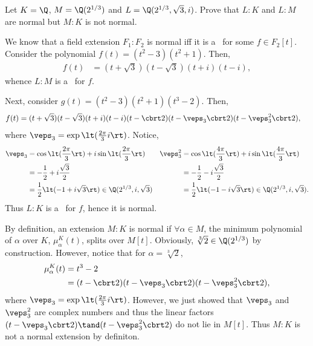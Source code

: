 \documentclass{article}
\begin{document}
\setcounter{section}{7} %
\begin{exercise}
Let \( K = \Q \), \( M = \Q(2^{1/3}) \) and \( L = \Q(2^{1/3}, \sqrt 3, i) \).
Prove that \( L:K \) and \( L:M \) are normal but \( M:K \) is not normal.
\end{exercise}
\begin{solution}
We know that a field extension \( F_1:F_2 \) is normal iff it is a \sfe~for some \( f\in F_2[t] \).
Consider the polynomial \( f(t) = (t^2-3)(t^2+1) \).
Then, \begin{align*}
  f(t) &= (t+\sqrt 3)(t-\sqrt 3)(t+i)(t-i),
\end{align*}
whence \( L:M \) is a \sfe~for \( f \).

Next, consider \( g(t) = (t^2-3)(t^2+1)(t^3-2) \).
Then, \begin{align*}
  f(t) &= (t+\sqrt 3)(t-\sqrt 3)(t+i)(t-i)(t-\cbrt 2)(t-\veps_3\cbrt 2)(t-\veps_3^2\cbrt 2),
\end{align*}
where \( \veps_3 = \exp\lt(\frac{2\pi}{3}i\rt) \).
Notice, \begin{align*}
  \veps_3 &= \cos\lt(\frac{2\pi}{3}\rt) + i\sin\lt(\frac{2\pi}{3}\rt)    & \veps_3^2 &= \cos\lt(\frac{4\pi}{3}\rt) + i\sin\lt(\frac{4\pi}{3}\rt) \\
          &= -\frac{1}{2}+i\frac{\sqrt 3}{2} & &= -\frac{1}{2}-i\frac{\sqrt 3}{2} \\
          &= \frac{1}{2}\lt(-1+i\sqrt 3\rt)\in \Q(2^{1/3},i,\sqrt 3) & &= \frac{1}{2}\lt(-1-i\sqrt 3\rt) \in \Q(2^{1/3},i,\sqrt 3).
\end{align*}
Thus \( L:K \) is a \sfe~for \( f \), hence it is normal.

By definition, an extension \( M:K \) is normal if \( \forall \alpha\in M \), the minimum polynomial of \( \alpha \) over \( K \), \( \mu_\alpha^K(t) \), splits over \( M[t] \).
Obviously, \( \sqrt[3]2 \in \Q(2^{1/3}) \) by construction.
However, notice that for \( \alpha=\sqrt[3]2 \), \begin{align*}
  \mu_\alpha^K(t) &= t^3-2 \\
  &= (t-\cbrt 2)(t-\veps_3\cbrt 2)(t-\veps_3^2\cbrt 2),
\end{align*}
where \( \veps_3 = \exp\lt(\frac{2\pi}{3}i\rt) \).
However, we just showed that \( \veps_3 \) and \( \veps_3^2 \) are complex numbers and thus the linear factors \( (t-\veps_3\cbrt 2)\tand (t-\veps_3^2\cbrt 2) \) do not lie in \( M[t] \).
Thus \( M:K \) is not a normal extension by definiton.
\end{solution}
\end{document}
